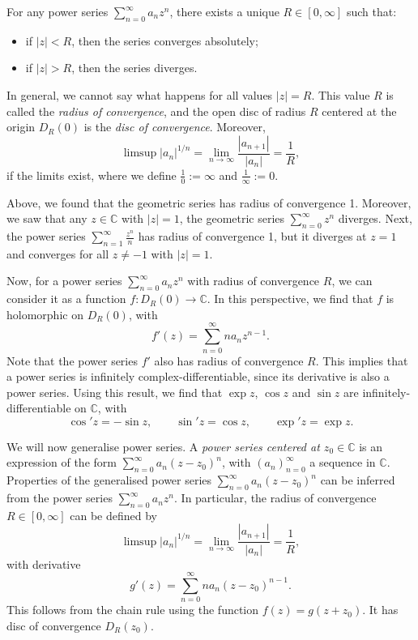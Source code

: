 \documentclass[a4paper, openany]{memoir}
\theoremstyle{definition}
\theoremstyle{plain}
\begin{document}
    For any power series $\sum_{n=0}^\infty a_n z^n$, there exists a unique $R \in [0, \infty]$ such that:
    \begin{itemize}
        \item if $|z| < R$, then the series converges absolutely;
        \item if $|z| > R$, then the series diverges.
    \end{itemize}
    In general, we cannot say what happens for all values $|z| = R$. This value $R$ is called the \emph{radius of convergence}, and the open disc of radius $R$ centered at the origin $D_R(0)$ is the \emph{disc of convergence}. Moreover,
    \[\limsup |a_n|^{1/n} = \lim_{n \to \infty} \frac{|a_{n+1}|}{|a_n|} = \frac{1}{R},\]
    if the limits exist, where we define $\frac{1}{0} := \infty$ and $\frac{1}{\infty} := 0$. 

    Above, we found that the geometric series has radius of convergence 1. Moreover, we saw that any $z \in \mathbb{C}$ with $|z| = 1$, the geometric series $\sum_{n=0}^\infty z^n$ diverges. Next, the power series $\sum_{n=1}^\infty \frac{z^n}{n}$ has radius of convergence 1, but it diverges at $z = 1$ and converges for all $z \neq -1$ with $|z| = 1$.

    Now, for a power series $\sum_{n=0}^\infty a_n z^n$ with radius of convergence $R$, we can consider it as a function $f \colon D_R(0) \to \mathbb{C}$. In this perspective, we find that $f$ is holomorphic on $D_R(0)$, with 
    \[f'(z) = \sum_{n=0}^\infty na_n z^{n-1}.\]
    Note that the power series $f'$ also has radius of convergence $R$. This implies that a power series is infinitely complex-differentiable, since its derivative is also a power series. Using this result, we find that $\exp z$, $\cos z$ and $\sin z$ are infinitely-differentiable on $\mathbb{C}$, with
    \[\cos' z = -\sin z, \qquad \sin' z = \cos z, \qquad \exp' z = \exp z.\]

    We will now generalise power series. A \emph{power series centered at $z_0 \in \mathbb{C}$} is an expression of the form $\sum_{n=0}^\infty a_n (z - z_0)^n$, with $(a_n)_{n=0}^\infty$ a sequence in $\mathbb{C}$. Properties of the generalised power series $\sum_{n=0}^\infty a_n (z - z_0)^n$ can be inferred from the power series $\sum_{n=0}^\infty a_n z^n$. In particular, the radius of convergence $R \in [0, \infty]$ can be defined by
    \[\limsup |a_n|^{1/n} = \lim_{n \to \infty} \frac{|a_{n+1}|}{|a_n|} = \frac{1}{R},\]
    with derivative
    \[g'(z) = \sum_{n=0}^\infty na_n (z - z_0)^{n-1}.\]
    This follows from the chain rule using the function $f(z) = g(z + z_0)$. It has disc of convergence $D_R(z_0)$.
\end{document}
